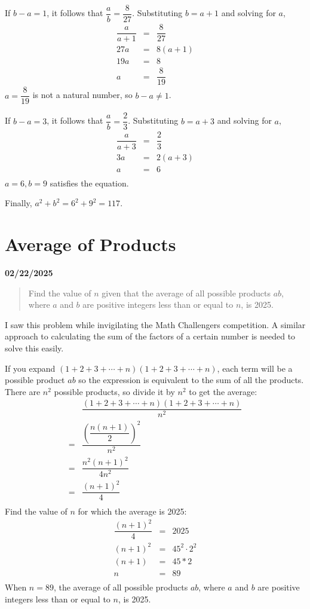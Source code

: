 \documentclass[12pt, oneside]{article}
\begin{document}
If $b-a=1$, it follows that $\dfrac{a}{b} = \dfrac{8}{27}$. Substituting $b = a+1$ and solving for $a$,
\begin{eqnarray*}
\dfrac{a}{a+1} &=& \dfrac{8}{27}\\
27a &=& 8(a+1)\\
19a &=& 8\\
a &=& \dfrac{8}{19}
\end{eqnarray*}
$a=\dfrac{8}{19}$ is not a natural number, so $b-a\neq1$.

If $b-a=3$, it follows that $\dfrac{a}{b} = \dfrac{2}{3}$. Substituting $b = a+3$ and solving for $a$,
\begin{eqnarray*}
\dfrac{a}{a+3} &=& \dfrac{2}{3}\\
3a &=& 2(a+3)\\
a &=& 6\\
\end{eqnarray*}
$a=6, b=9$ satisfies the equation.

Finally, $a^2+b^2 = 6^2+9^2 = 117$.
\section*{Average of Products}
\textbf{02/22/2025}
\begin{quote}
Find the value of $n$ given that the average of all possible products $ab$, where $a$ and $b$ are positive integers less than or equal to $n$, is 2025.
\end{quote}
I saw this problem while invigilating the Math Challengers competition. A similar approach to calculating the sum of the factors of a certain number is needed to solve this easily.

If you expand $(1+2+3+ \cdots + n)(1+2+3+ \cdots + n)$, each term will be a possible product $ab$ so the expression is equivalent to the sum of all the products. There are $n^2$ possible products, so divide it by $n^2$ to get the average:
\begin{eqnarray*}
&\dfrac{(1+2+3+ \cdots + n)(1+2+3+ \cdots + n)}{n^2}\\
=&\dfrac{\left(\dfrac{n(n+1)}{2}\right)^2}{n^2}\\
=&\dfrac{n^2(n+1)^2}{4n^2}\\
=&\dfrac{(n+1)^2}{4}\\
\end{eqnarray*}
Find the value of $n$ for which the average is 2025:
\begin{eqnarray*}
\dfrac{(n+1)^2}{4}&=&2025\\
(n+1)^2&=&45^2 \cdot 2^2\\
(n+1)&=&45 * 2\\
n&=&89\\
\end{eqnarray*}
When $n=89$, the average of all possible products $ab$, where $a$ and $b$ are positive integers less than or equal to $n$, is 2025.
\end{document}
